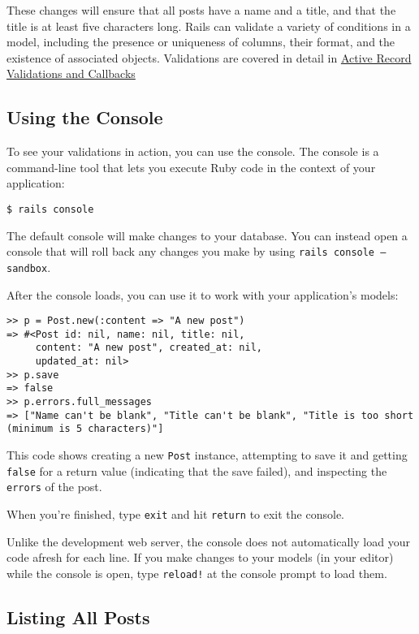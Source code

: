 \documentclass[10pt]{book}
\begin{document}
These changes will ensure that all posts have a name and a title, and that the title is at least five characters long. Rails can validate a variety of conditions in a model, including the presence or uniqueness of columns, their format, and the existence of associated objects. Validations are covered in detail in \href{http://guides.rubyonrails.org/active_record_validations_callbacks.html#validations-overview}{Active Record Validations and Callbacks}

\subsection{ Using the Console}

To see your validations in action, you can use the console. The console is a command-line tool that lets you execute Ruby code in the context of your application:


\begin{verbatim}
$ rails console
\end{verbatim}

The default console will make changes to your database. You can instead open a console that will roll back any changes you make by using \texttt{rails console —sandbox}.

After the console loads, you can use it to work with your application’s models:

\begin{verbatim}
>> p = Post.new(:content => "A new post")
=> #<Post id: nil, name: nil, title: nil,
     content: "A new post", created_at: nil,
     updated_at: nil>
>> p.save
=> false
>> p.errors.full_messages
=> ["Name can't be blank", "Title can't be blank", "Title is too short (minimum is 5 characters)"]
\end{verbatim}

This code shows creating a new \texttt{Post} instance, attempting to save it and getting \texttt{false} for a return value (indicating that the save failed), and inspecting the \texttt{errors} of the post.

When you’re finished, type \texttt{exit} and hit \texttt{return} to exit the console.

Unlike the development web server, the console does not automatically load your code afresh for each line. If you make changes to your models (in your editor) while the console is open, type \texttt{reload!} at the console prompt to load them.

\subsection{ Listing All Posts}
\end{document}
